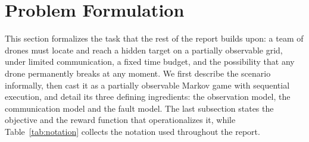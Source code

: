 \section{Problem Formulation}
\label{sec:problem}

This section formalizes the task that the rest of the report builds upon: a team
of drones must locate and reach a hidden target on a partially observable grid,
under limited communication, a fixed time budget, and the possibility that any
drone permanently breaks at any moment. We first describe the scenario
informally, then cast it as a partially observable Markov game with sequential
execution, and detail its three defining ingredients: the observation model, the
communication model and the fault model. The last subsection states the objective
and the reward function that operationalizes it, while
Table~\ref{tab:notation} collects the notation used throughout the report.

